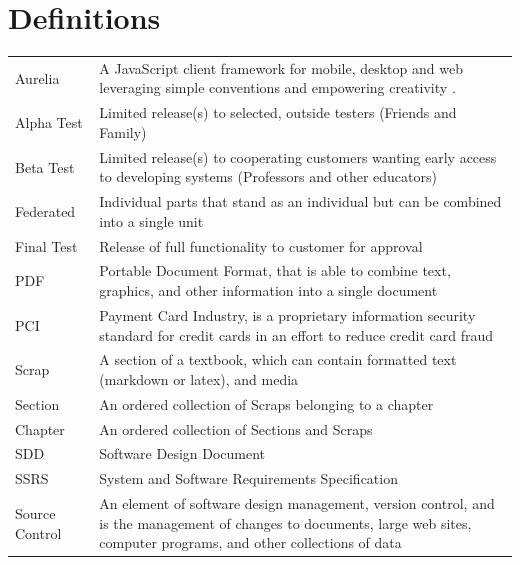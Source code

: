 \documentclass[letterpaper, 10pt, draftclsnofoot, compsoc, onecolumn]{IEEEtran}
\begin{document}
\section{Definitions}
\begin{center}


\begin{supertabular}{p{3cm}p{12cm}}

Aurelia & A JavaScript client framework for mobile, desktop and web leveraging
	simple conventions and empowering creativity \cite{Aurelia}. \\

Alpha Test & Limited release(s) to selected, outside testers (Friends and Family)\\

Beta Test & Limited release(s) to cooperating customers wanting early
	access to developing systems (Professors and other educators)\\

Federated & Individual parts that stand as an individual but can be combined into a single unit \\

Final Test & Release of full functionality to customer for approval \\

PDF & Portable Document Format, that is able to combine text,
	graphics, and other information into a single document \\

PCI & Payment Card Industry, is a proprietary information security
standard for credit cards in an effort to reduce credit card fraud \\

Scrap & A section of a textbook, which can contain formatted text (markdown or latex), and media \\

Section & An ordered collection of Scraps belonging to a chapter\\

Chapter & An ordered collection of Sections and Scraps\\

SDD & Software Design Document \\

SSRS & System and Software Requirements Specification \\

Source Control & An element of software design management, version control, and is the
management of changes to documents, large web sites, computer programs, and other
collections of data \\


\end{supertabular}
\end{center}
\end{document}
